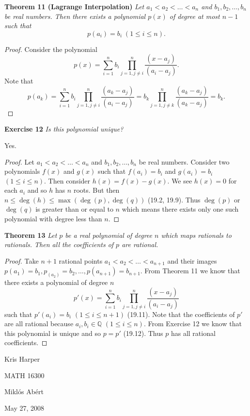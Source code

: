 \documentclass{article}
\begin{document}
\begin{flushleft}
\textbf{Theorem 11 (Lagrange Interpolation)}
\textsl{Let $a_1 < a_2 < \dots < a_n$ and $b_1, b_2, \dots , b_n$ be real numbers. Then there exists a polynomial $p(x)$ of degree at most $n-1$ such that
\[
p(a_i) = b_i \; (1 \leq i \leq n).
\]}
\begin{proof}
Consider the polynomial
\[
p(x) = \sum_{i=1}^n b_i \prod_{j=1, j \neq i}^n \frac{(x-a_j)}{(a_i-a_j)}.
\]
Note that
\[
p(a_k) = \sum_{i=1}^n b_i \prod_{j=1, j \neq i}^n \frac{(a_k-a_j)}{(a_i-a_j)} = b_k \prod_{j=1, j \neq k}^n \frac{(a_k-a_j)}{(a_k-a_j)} = b_k.
\]
\end{proof}

\textbf{Exercise 12}
\textsl{Is this polynomial unique?}\newline

Yes.
\begin{proof}
Let $a_1 < a_2 < \dots < a_n$ and $b_1, b_2, \dots , b_n$ be real numbers. Consider two polynomials $f(x)$ and $g(x)$ such that $f(a_i) = b_i$ and $g(a_i) = b_i$ $(1 \leq i \leq n)$. Then consider $h(x) = f(x) - g(x)$. We see $h(x) = 0$ for each $a_i$ and so $h$ has $n$ roots. But then $n \leq \deg(h) \leq \max(\deg(p), \deg(q))$ (19.2, 19.9). Thus $\deg(p)$ or $\deg(q)$ is greater than or equal to $n$ which means there exists only one such polynomial with degree less than $n$.
\end{proof}

\textbf{Theorem 13}
\textsl{Let $p$ be a real polynomial of degree $n$ which maps rationals to rationals. Then all the coefficients of $p$ are rational.}
\begin{proof}
Take $n+1$ rational points $a_1 < a_2 < \dots < a_{n+1}$ and their images $p(a_1) = b_1, p_(a_2) = b_2, \dots , p(a_{n+1}) = b_{n+1}$. From Theorem 11 we know that there exists a polynomial of degree $n$
\[
p'(x) = \sum_{i=1}^n b_i \prod_{j=1, j \neq i}^n \frac{(x-a_j)}{(a_i-a_j)}
\]
such that $p'(a_i) = b_i$ $(1 \leq i \leq n+1)$ (19.11). Note that the coefficients of $p'$ are all rational because $a_i,b_i \in \mathbb{Q}$ $(1 \leq i \leq n)$. From Exercise 12 we know that this polynomial is unique and so $p=p'$ (19.12). Thus $p$ has all rational coefficients.
\end{proof}

\end{flushleft}

\newpage

\begin{flushright}
Kris Harper

MATH 16300

Mikl\'{o}s Ab\'{e}rt

May 27, 2008
\end{flushright}
\end{document}
